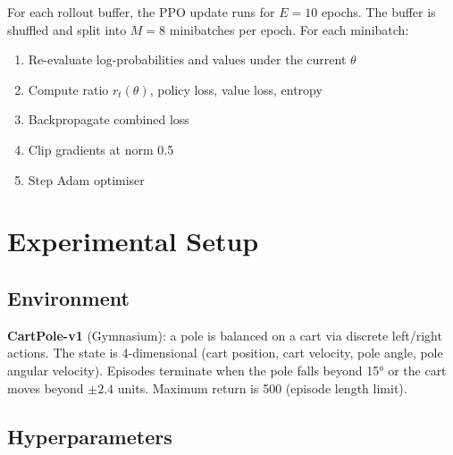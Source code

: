 \documentclass[12pt,a4paper]{article}
\begin{document}
For each rollout buffer, the PPO update runs for $E = 10$ epochs. The buffer is shuffled and split into $M = 8$ minibatches per epoch. For each minibatch:
\begin{enumerate}[noitemsep]
    \item Re-evaluate log-probabilities and values under the current $\theta$
    \item Compute ratio $r_t(\theta)$, policy loss, value loss, entropy
    \item Backpropagate combined loss
    \item Clip gradients at norm 0.5
    \item Step Adam optimiser
\end{enumerate}

\section{Experimental Setup}

\subsection{Environment}

\textbf{CartPole-v1} (Gymnasium): a pole is balanced on a cart via discrete left/right actions. The state is 4-dimensional (cart position, cart velocity, pole angle, pole angular velocity). Episodes terminate when the pole falls beyond 15° or the cart moves beyond $\pm 2.4$ units. Maximum return is 500 (episode length limit).

\subsection{Hyperparameters}
\end{document}
